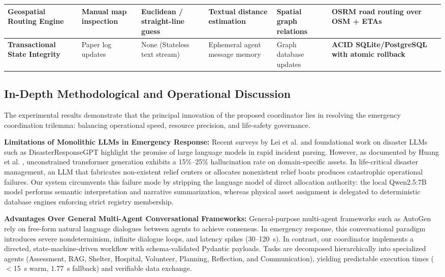 \documentclass[conference]{IEEEtran}
\begin{document}
\begin{table}[htbp]
{\begin{tabular}{|p{3.4cm}|p{2.7cm}|p{2.8cm}|p{2.8cm}|p{2.8cm}|p{3.4cm}|}
\hline
\textbf{Geospatial Routing Engine} & Manual map inspection & Euclidean / straight-line guess & Textual distance estimation & Spatial graph relations & \textbf{OSRM road routing \cite{b10} over OSM \cite{b9} + ETAs} \\
\hline
\textbf{Transactional State Integrity} & Paper log updates & None (Stateless text stream) & Ephemeral agent message memory & Graph database updates & \textbf{ACID SQLite/PostgreSQL with atomic rollback} \\
\hline
\end{tabular}%
}
\end{table}

\subsection{In-Depth Methodological and Operational Discussion}
The experimental results demonstrate that the principal innovation of the proposed coordinator lies in resolving the emergency coordination trilemma: balancing operational speed, resource precision, and life-safety governance.

\textbf{Limitations of Monolithic LLMs in Emergency Response:} Recent surveys by Lei et al. \cite{b1} and foundational work on disaster LLMs such as DisasterResponseGPT \cite{b2} highlight the promise of large language models in rapid incident parsing. However, as documented by Huang et al. \cite{b8}, unconstrained transformer generation \cite{b11} exhibits a 15\%--25\% hallucination rate on domain-specific assets. In life-critical disaster management, an LLM that fabricates non-existent relief centers or allocates nonexistent relief boats produces catastrophic operational failures. Our system circumvents this failure mode by stripping the language model of direct allocation authority: the local Qwen2.5:7B model \cite{b7} performs semantic interpretation and narrative summarization, whereas physical asset assignment is delegated to deterministic database engines enforcing strict registry membership.

\textbf{Advantages Over General Multi-Agent Conversational Frameworks:} General-purpose multi-agent frameworks such as AutoGen \cite{b14} rely on free-form natural language dialogues between agents to achieve consensus. In emergency response, this conversational paradigm introduces severe nondeterminism, infinite dialogue loops, and latency spikes (30--120~s). In contrast, our coordinator implements a directed, state-machine-driven workflow with schema-validated Pydantic payloads. Tasks are decomposed hierarchically into specialized agents (Assessment, RAG, Shelter, Hospital, Volunteer, Planning, Reflection, and Communication), yielding predictable execution times ($<$15~s warm, 1.77~s fallback) and verifiable data exchange.
\end{document}
